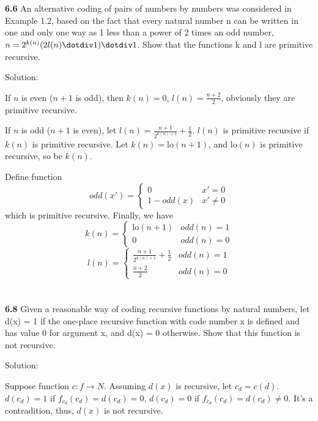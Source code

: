 \documentclass{ctexart}
\begin{document}
\section*{}

\textbf{6.6} An alternative coding of pairs of numbers by numbers was considered in
Example 1.2, based on the fact that every natural number n can be written
in one and only one way as 1 less than a power of 2 times an odd number,
$n = 2^{k(n)} (2l(n) \dotdiv 1) \dotdiv 1$. Show that the functions k and l are primitive recursive.

Solution:

If $n$ is even ($n + 1$ is odd), then $k(n) = 0$, $l(n) = \frac{n + 2}{2}$, obviously they are primitive recursive.

If $n$ is odd ($n+1$ is even), let $l(n) = \frac{n + 1}{2^{k(n) + 1}} + \frac 1 2$. $l(n)$ is primitive recursive if $k(n)$
is primitive recursive. Let $k(n) = \mathrm{lo}(n + 1)$, and $\mathrm{lo}(n)$ is primitive recursive, so be $k(n)$.

Define function
$$
odd(x') = \begin{cases}
0 & x' = 0 \\
1 - odd(x) & x' \ne 0
\end{cases}
$$
which is primitive recursive. Finally, we have
$$
k(n) = \begin{cases}
\mathrm{lo}(n + 1) & odd(n) = 1 \\
0 & odd(n) = 0
\end{cases}
$$
$$
l(n) = \begin{cases}
\frac{n + 1}{2^{k(n)+1}} + \frac 1 2 & odd(n) = 1 \\
\frac{n + 2}{2} & odd(n) = 0
\end{cases}
$$

\section*{}

\textbf{6.8} Given a reasonable way of coding recursive functions by natural numbers, let
d(x) = 1 if the one-place recursive function with code number x is defined and
has value 0 for argument x, and d(x) = 0 otherwise. Show that this function is
not recursive.

Solution:

Suppose function $c: f \to N$. Assuming $d(x)$ is recursive, let $c_d = c(d)$. $d(c_d) = 1$ if
$f_{c_d}(c_d) = d(c_d) = 0$, $d(c_d) = 0$ if $f_{c_d}(c_d) = d(c_d) \ne 0$. It's a contradition,
thus, $d(x)$ is not recursive.
\end{document}
